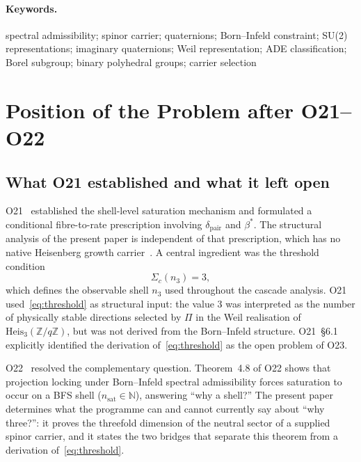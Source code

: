 \documentclass[11pt,a4paper]{article}
\newcommand{\bstar}{\beta^{*}}
\newcommand{\Heis}{\mathrm{Heis}_{3}(\mathbb{Z}/q\mathbb{Z})}
\newcommand{\dpair}{\delta_{\mathrm{pair}}}
\begin{document}
  \paragraph{Keywords.}
    spectral admissibility; spinor carrier; quaternions; Born–Infeld constraint;
    SU(2) representations; imaginary quaternions; Weil representation; ADE classification;
    Borel subgroup; binary polyhedral groups; carrier selection

    \clearpage
    \tableofcontents

    \clearpage
  \section{Position of the Problem after O21--O22}
  \label{sec:position}

  \subsection{What O21 established and what it left open}
    \label{ssec:o21-status}

    O21~\cite{Beau2026a25} established the shell-level saturation mechanism and formulated
    a conditional fibre-to-rate prescription involving $\dpair$ and $\bstar$.
    The structural analysis of the present paper is independent of that prescription, which
    has no native Heisenberg growth carrier~\cite{Beau2026sgn}.
    A central ingredient was the threshold condition
    \begin{equation}
      \label{eq:threshold}
      \Sigma_{c}(n_{3}) = 3,
    \end{equation}
    which defines the observable shell $n_{3}$ used throughout the cascade analysis.
    O21 used~\eqref{eq:threshold} as structural input: the value $3$ was interpreted as
    the number of physically stable directions selected by $\Pi$ in the Weil realisation
    of $\Heis$, but was not derived from the Born--Infeld structure.
    O21~§6.1 explicitly identified the derivation of~\eqref{eq:threshold} as the open
    problem of O23.

    O22~\cite{Beau2026a26} resolved the complementary question.
    Theorem~4.8 of O22 shows that projection locking under Born--Infeld spectral
    admissibility forces saturation to occur on a BFS shell ($n_{\mathrm{sat}} \in
  \mathbb{N}$), answering ``why a shell?''
    The present paper determines what the programme can and cannot currently say about
    ``why three?'': it proves the threefold dimension of the neutral sector of a supplied
    spinor carrier, and it states the two bridges that separate this theorem from a
    derivation of~\eqref{eq:threshold}.
\end{document}
